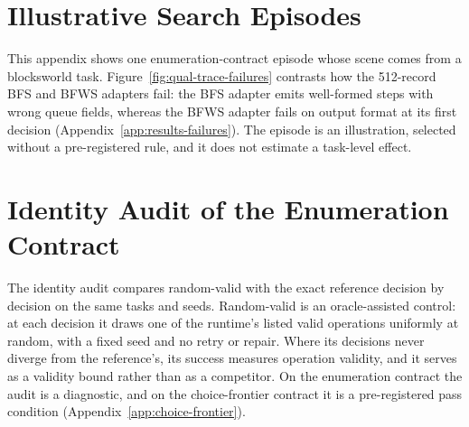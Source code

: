 
\section{Illustrative Search Episodes}
\label{app:qualitative}

This appendix shows one enumeration-contract episode whose scene comes from a blocksworld task. Figure~\ref{fig:qual-trace-failures} contrasts how the 512-record BFS and BFWS adapters fail: the BFS adapter emits well-formed steps with wrong queue fields, whereas the BFWS adapter fails on output format at its first decision (Appendix~\ref{app:results-failures}). The episode is an illustration, selected without a pre-registered rule, and it does not estimate a task-level effect.

\clearpage

\section{Identity Audit of the Enumeration Contract}
\label{app:identity}
\label{sec:results-identity}

The identity audit compares random-valid with the exact reference decision by decision on the same tasks and seeds. Random-valid is an oracle-assisted control: at each decision it draws one of the runtime's listed valid operations uniformly at random, with a fixed seed and no retry or repair. Where its decisions never diverge from the reference's, its success measures operation validity, and it serves as a validity bound rather than as a competitor. On the enumeration contract the audit is a diagnostic, and on the choice-frontier contract it is a pre-registered pass condition (Appendix~\ref{app:choice-frontier}).

